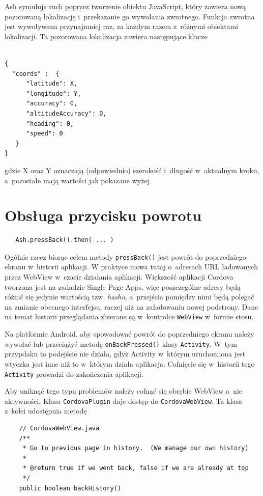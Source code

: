 \documentclass[brudnopis]{xmgr}
\begin{document}
Ash symuluje ruch poprzez tworzenie obiektu JavaScript, który zawiera nową pozorowaną lokalizację i~przekazanie go wywołania zwrotnego. Funkcja zwrotna jest wywoływana przynajmniej raz, za każdym razem z~różnymi obiektami lokalizacji. Ta pozorowana lokalizacja zawiera następujące klucze

\begin{lstlisting}

{
  "coords" :  {
      "latitude": X, 
      "longitude": Y,
      "accuracy": 0, 
      "altitudeAccuracy": 0, 
      "heading": 0, 
      "speed": 0
   }
}

\end{lstlisting}

gdzie X oraz Y oznaczają (odpowiednio) szerokość i~długość w~aktualnym kroku, a~pozostałe mają wartości jak pokazane wyżej.   

\section{Obsługa przycisku powrotu}

\begin{lstlisting}
   Ash.pressBack().then( ... ) 
\end{lstlisting}

Ogólnie rzecz biorąc celem metody \texttt{pressBack()} jest powrót do poprzedniego ekranu w~historii aplikacji. W praktyce mowa tutaj o~adresach URL ładowanych przez WebView w~czasie działania aplikacji. Większość aplikacji Cordova tworzona jest na zadadzie Single Page Apps, więc poszczególne adresy będą różnić się jedynie wartością tzw. \textit{hashu}, a~przejścia pomiędzy nimi będą polegać na zmianie obecnego interfejsu, raczej niż na załadowaniu nowej podstrony. Dane na temat historii przeglądania zbierane są w~kontrolce \texttt{WebView} w~formie stosu.

Na platformie Android, aby spowodować powrót do poprzedniego ekranu należy wywołać lub przeciążyć metodę \texttt{onBackPressed()} klasy \texttt{Activity}. W~tym przypdaku to podejście nie działa, gdyż Activity w~którym uruchomiona jest wtyczka jest inne niż to w~którym działa aplikacja. Cofnięcie się w~historii tego \texttt{Activity} prowadzi do zakończenia aplikacji. 

Aby uniknąć tego typu problemów należy cofnąć się obrębie WebView a~nie aktywności. Klasa \texttt{CordovaPlugin} daje dostęp do \texttt{CordovaWebView}. Ta klasa z~kolei udostępnia metodę 

\begin{lstlisting}
    // CordovaWebView.java
    /**
     * Go to previous page in history.  (We manage our own history)
     *
     * @return true if we went back, false if we are already at top
     */
    public boolean backHistory()
\end{lstlisting}
\end{document}
